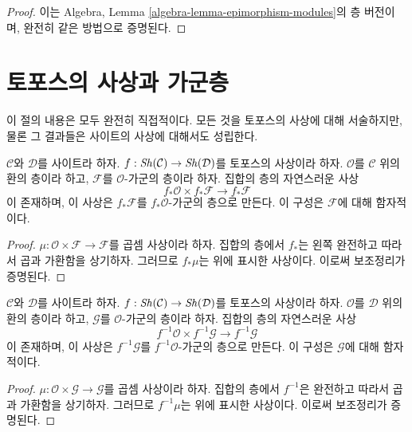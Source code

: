 \begin{proof}
이는 Algebra, Lemma \ref{algebra-lemma-epimorphism-modules}의 층 버전이며,
완전히 같은 방법으로 증명된다.
\end{proof}




\section{토포스의 사상과 가군층}
\label{section-sheaves-modules-functorial}

\noindent
이 절의 내용은 모두 완전히 직접적이다. 모든 것을 토포스의 사상에 대해
서술하지만, 물론 그 결과들은 사이트의 사상에 대해서도 성립한다.

\begin{lemma}
\label{lemma-pushforward-module}
$\mathcal{C}$와 $\mathcal{D}$를 사이트라 하자.
$f : \mathop{\mathit{Sh}}\nolimits(\mathcal{C}) \to \mathop{\mathit{Sh}}\nolimits(\mathcal{D})$를 토포스의 사상이라 하자.
$\mathcal{O}$를 $\mathcal{C}$ 위의 환의 층이라 하고, $\mathcal{F}$를
$\mathcal{O}$-가군의 층이라 하자. 집합의 층의 자연스러운 사상
$$
f_*\mathcal{O} \times f_*\mathcal{F}
\longrightarrow
f_*\mathcal{F}
$$
이 존재하며, 이 사상은 $f_*\mathcal{F}$를 $f_*\mathcal{O}$-가군의 층으로
만든다. 이 구성은 $\mathcal{F}$에 대해 함자적이다.
\end{lemma}

\begin{proof}
$\mu : \mathcal{O} \times \mathcal{F} \to \mathcal{F}$를 곱셈 사상이라 하자.
집합의 층에서 $f_*$는 왼쪽 완전하고 따라서 곱과 가환함을 상기하자.
그러므로 $f_*\mu$는 위에 표시한 사상이다. 이로써 보조정리가 증명된다.
\end{proof}

\begin{lemma}
\label{lemma-pullback-module}
$\mathcal{C}$와 $\mathcal{D}$를 사이트라 하자.
$f : \mathop{\mathit{Sh}}\nolimits(\mathcal{C}) \to \mathop{\mathit{Sh}}\nolimits(\mathcal{D})$를 토포스의 사상이라 하자.
$\mathcal{O}$를 $\mathcal{D}$ 위의 환의 층이라 하고, $\mathcal{G}$를
$\mathcal{O}$-가군의 층이라 하자. 집합의 층의 자연스러운 사상
$$
f^{-1}\mathcal{O} \times f^{-1}\mathcal{G}
\longrightarrow
f^{-1}\mathcal{G}
$$
이 존재하며, 이 사상은 $f^{-1}\mathcal{G}$를
$f^{-1}\mathcal{O}$-가군의 층으로 만든다. 이 구성은 $\mathcal{G}$에 대해
함자적이다.
\end{lemma}

\begin{proof}
$\mu : \mathcal{O} \times \mathcal{G} \to \mathcal{G}$를 곱셈 사상이라 하자.
집합의 층에서 $f^{-1}$은 완전하고 따라서 곱과 가환함을 상기하자.
그러므로 $f^{-1}\mu$는 위에 표시한 사상이다. 이로써 보조정리가 증명된다.
\end{proof}

